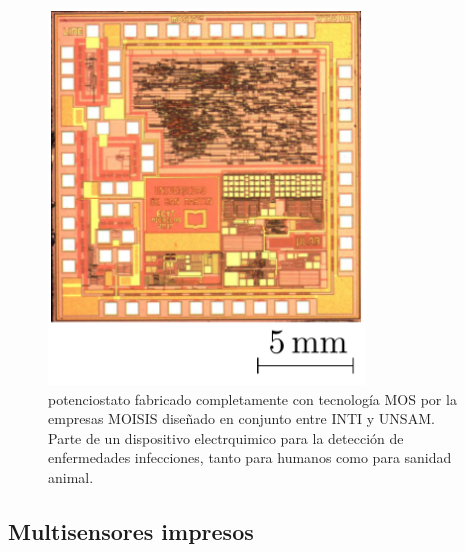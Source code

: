  			\begin{figure}[th!]
			    \begin{center}
			    \includegraphics[width=0.75\textwidth]{Imagenes/potenciostato-chip.pdf}
	       		\caption{potenciostato fabricado completamente con tecnología MOS por la empresas MOISIS diseñado en conjunto entre INTI y UNSAM. Parte de un dispositivo electrquimico para la detección de enfermedades infecciones, tanto para humanos como para sanidad animal. }
	         	\label{fig:pote-onchip}
	     		\end{center}
	     		\end{figure}


  \subsection{Multisensores impresos}

